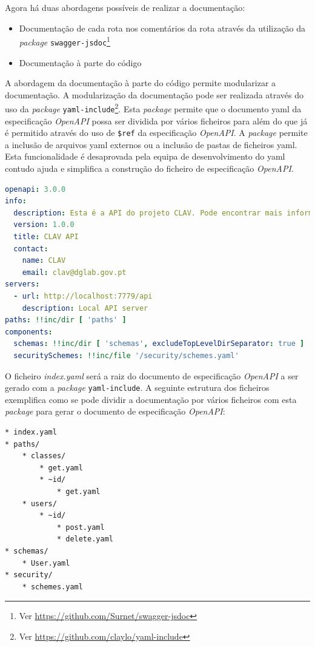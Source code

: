 Agora há duas abordagens possíveis de realizar a documentação:
\begin{itemize}
    \item Documentação de cada rota nos comentários da rota através da utilização da \textit{package} \texttt{swagger-jsdoc}\footnote{Ver \url{https://github.com/Surnet/swagger-jsdoc}}
    \item Documentação à parte do código
\end{itemize}

A abordagem da documentação à parte do código permite modularizar a documentação. A modularização da documentação pode ser realizada através do uso da \textit{package} \texttt{yaml-include}\footnote{Ver \url{https://github.com/claylo/yaml-include}}. Esta \textit{package} permite que o documento \acrshort{yaml} da especificação \textit{OpenAPI} possa ser dividida por vários ficheiros para além do que já é permitido através do uso de \verb|$ref| da especificação \textit{OpenAPI}. A \textit{package} permite a inclusão de arquivos \acrshort{yaml} externos ou a inclusão de pastas de ficheiros \acrshort{yaml}. Esta funcionalidade é desaprovada pela equipa de desenvolvimento do \acrshort{yaml} contudo ajuda e simplifica a construção do ficheiro de especificação \textit{OpenAPI}.

\begin{lstlisting}[language=yaml, caption=Exemplo de uso do \texttt{yaml-include} no documento de especificação \textit{OpenAPI}(\textit{index.yaml}), label=exem:yamli]
openapi: 3.0.0
info:
  description: Esta é a API do projeto CLAV. Pode encontrar mais informação sobre o CLAV em [http://clav.dglab.gov.pt](http://clav.dglab.gov.pt).
  version: 1.0.0
  title: CLAV API
  contact:
    name: CLAV
    email: clav@dglab.gov.pt
servers:
  - url: http://localhost:7779/api
    description: Local API server
paths: !!inc/dir [ 'paths' ]
components:
  schemas: !!inc/dir [ 'schemas', excludeTopLevelDirSeparator: true ]
  securitySchemes: !!inc/file '/security/schemes.yaml'
\end{lstlisting}

O ficheiro \textit{index.yaml} será a raiz do documento de especificação \textit{OpenAPI} a ser gerado com a \textit{package} \texttt{yaml-include}. A seguinte estrutura dos ficheiros exemplifica como se pode dividir a documentação por vários ficheiros com esta \textit{package} para gerar o documento de especificação \textit{OpenAPI}:
\begin{lstlisting}[language=pseudocode, caption=Exemplo de estrutura dos ficheiros para gerar o documento de especificação \textit{OpenAPI}, label=exem:faf]
* index.yaml
* paths/
    * classes/
        * get.yaml
        * ~id/
            * get.yaml
    * users/
        * ~id/
            * post.yaml
            * delete.yaml
* schemas/
    * User.yaml
* security/
    * schemes.yaml
\end{lstlisting}

